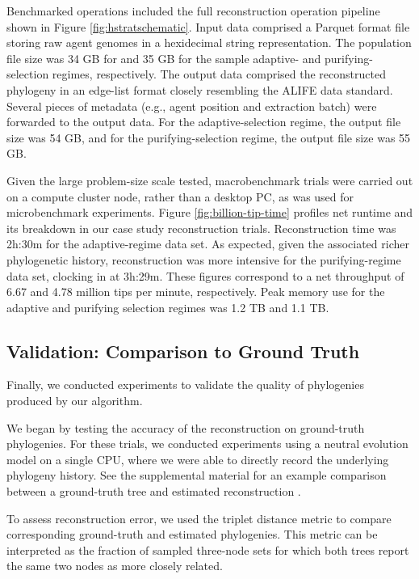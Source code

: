 Benchmarked operations included the full reconstruction operation pipeline shown in Figure \ref{fig:hstratschematic}.
Input data comprised a Parquet format file storing raw agent genomes in a hexidecimal string representation.
The population file size was 34 GB for and 35 GB for the sample adaptive- and purifying-selection regimes, respectively.
The output data comprised the reconstructed phylogeny in an edge-list format closely resembling the ALIFE data standard.
Several pieces of metadata (e.g., agent position and extraction batch) were forwarded to the output data.
For the adaptive-selection regime, the output file size was 54 GB, and for the purifying-selection regime, the output file size was 55 GB.

Given the large problem-size scale tested, macrobenchmark trials were carried out on a compute cluster node, rather than a desktop PC, as was used for microbenchmark experiments.
Figure \ref{fig:billion-tip-time} profiles net runtime and its breakdown in our case study reconstruction trials.
Reconstruction time was 2h:30m for the adaptive-regime data set.
As expected, given the associated richer phylogenetic history, reconstruction was more intensive for the purifying-regime data set, clocking in at 3h:29m.
These figures correspond to a net throughput of 6.67 and 4.78 million tips per minute, respectively.
Peak memory use for the adaptive and purifying selection regimes was 1.2 TB and 1.1 TB.

\subsection{Validation: Comparison to Ground Truth}

Finally, we conducted experiments to validate the quality of phylogenies produced by our algorithm.

We began by testing the accuracy of the reconstruction on ground-truth phylogenies.
For these trials, we conducted experiments using a neutral evolution model on a single CPU, where we were able to directly record the underlying phylogeny history. See the supplemental material for an example comparison between a ground-truth tree and estimated reconstruction \citep{supplemental}.

To assess reconstruction error, we used the triplet distance metric to compare corresponding ground-truth and estimated phylogenies.
This metric can be interpreted as the fraction of sampled three-node sets for which both trees report the same two nodes as more closely related.

